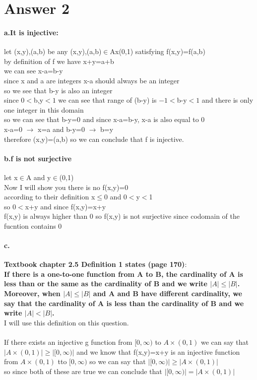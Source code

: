 \documentclass[11pt]{article}
\begin{document}
\section*{Answer 2}
\paragraph{a.It is injective:\\ }
let (x,y),(a,b) be any (x,y),(a,b)$\in$Ax(0,1) satisfying f(x,y)=f(a,b) \\
by definition of f we have x+y=a+b\\
we can see x-a=b-y\\
since x and a are integers x-a should always be an integer\\
so we see that b-y is also an integer\\
since $0<$b,y$<1$ we can see that range of (b-y) is $-1<$b-y$<1$ and there is only one integer in this domain\\
so we can see that b-y=0 and since x-a=b-y, x-a is also equal to 0\\
x-a=0 $\rightarrow$ x=a and b-y=0 $\rightarrow$ b=y \\
therefore (x,y)=(a,b) so we can conclude that f is injective.

\paragraph{b.f is not surjective\\}
let x$\in$A and y$\in$(0,1)\\
Now I will show you there is no f(x,y)=0\\
according to their definition x$\leq$0 and 0$<$y$<$1\\
so 0$<$x+y and since f(x,y)=x+y\\
f(x,y) is always higher than 0 so f(x,y) is not surjective since codomain of the fucntion contains 0 
\paragraph{c.}
\textbf{Textbook chapter 2.5 Definition 1 states (page 170)}:\\
\textbf{If there is a one-to-one function from A to B, the cardinality of A is less than or the same as the cardinality of B and we write $|A| \leq |B|$. Moreover, when $|A| \leq |B|$ and A and B have
different cardinality, we say that the cardinality of A is less than the cardinality of B and we
write $|A| < |B|$.}\\
I will use this definition on this question.\\
\\
If there exists an injective g function from $[0,\infty)$ to $A\times(0, 1)$ we can say that $|A\times(0, 1)|\geq|[0,\infty)|$
and we know that f(x,y)=x+y is an injective function from $A\times(0, 1)$ tto $[0,\infty)$ so we can say that $|[0,\infty)|\geq|A\times(0, 1)|$\\
so since both of these are true we can conclude that $|[0,\infty)|=|A\times(0, 1)|$\\
\end{document}
